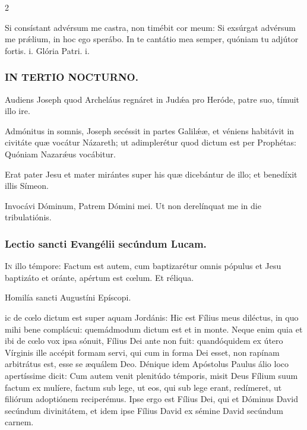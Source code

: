 \documentclass[9pt,twoside]{extarticle}
\begin{document}
\begin{multicols}{2}
\begin{tightlist}{}
\item {} Si consístant advérsum me castra, non timébit cor meum: \textred{*} Si exsúrgat advérsum me prǽlium, in hoc ego sperábo.  In te cantátio mea semper, quóniam tu adjútor fortis. i. Glória Patri. i.
\end{tightlist}

\subsubsection*{\center \textsc{IN TERTIO NOCTURNO.}}
\begin{tightlist}{}
\item {} Audiens Joseph quod Archeláus regnáret in Judǽa pro Heróde, patre suo, tímuit illo ire.
\item {} Admónitus in somnis, Joseph secéssit in partes Galilǽæ, et véniens habitávit in civitáte quæ vocátur Názareth; ut adimplerétur quod dictum est per Prophétas: Quóniam Nazarǽus vocábitur.
\item {} Erat pater Jesu et mater mirántes super his quæ dicebántur de illo; et benedíxit illis Símeon.
\item {} Invocávi Dóminum, Patrem Dómini mei.  Ut non derelínquat me in die tribulatiónis.
\end{tightlist}

\subsubsection*{\center Lectio sancti Evangélii secúndum Lucam.}
\begin{center}\end{center}
\lettrine{I}n illo témpore: Factum est autem, cum baptizarétur omnis pópulus et Jesu baptizáto et oránte, apértum est cœlum. Et réliqua.

\begin{center}Homilía sancti Augustíni Epíscopi.\\
\end{center}
ic de cœlo dictum est super aquam Jordánis: Hic est Fílius meus diléctus, in quo mihi bene complácui: quemádmodum dictum est et in monte. Neque enim quia et ibi de cœlo vox ipsa sónuit, Fílius Dei ante non fuit: quandóquidem ex útero Vírginis ille accépit formam servi, qui cum in forma Dei esset, non rapínam arbitrátus est, esse se æquálem Deo. Dénique idem Apóstolus Paulus álio loco apertíssime dicit: Cum autem venit plenitúdo témporis, misit Deus Fílium suum factum ex mulíere, factum sub lege, ut eos, qui sub lege erant, redímeret, ut filiórum adoptiónem reciperémus. Ipse ergo est Fílius Dei, qui et Dóminus David secúndum divinitátem, et idem ipse Fílius David ex sémine David secúndum carnem.


\end{multicols}
\end{document}
